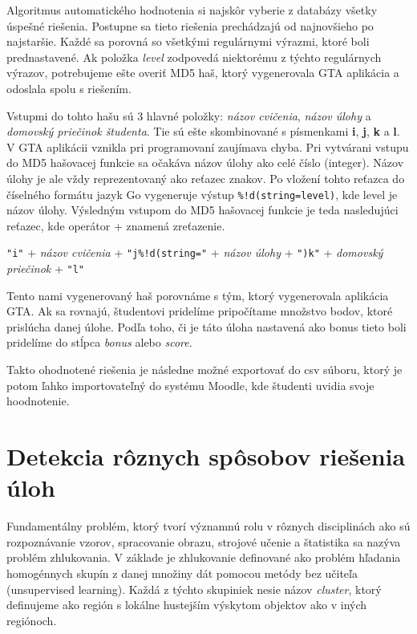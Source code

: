 Algoritmus automatického hodnotenia si najskôr vyberie z databázy všetky úspešné
riešenia. Postupne sa tieto riešenia prechádzajú od najnovšieho po najstaršie.
Každé sa porovná so všetkými regulárnymi výrazmi, ktoré boli prednastavené.
Ak položka \textit{level} zodpovedá niektorému z týchto regulárnych výrazov,
potrebujeme ešte overiť MD5 haš, ktorý vygenerovala GTA aplikácia a odoslala spolu
s riešením.

Vstupmi do tohto hašu sú 3 hlavné položky: \textit{názov cvičenia},
\textit{názov úlohy} a \textit{domovský priečinok študenta}. Tie sú ešte skombinované
s písmenkami \textbf{i}, \textbf{j}, \textbf{k} a \textbf{l}. V GTA aplikácii vznikla
pri programovaní zaujímava chyba. Pri vytvárani vstupu do MD5 hašovacej funkcie
sa očakáva názov úlohy ako celé číslo (integer). Názov úlohy je ale vždy reprezentovaný
ako reťazec znakov. Po vložení tohto reťazca do číselného formátu jazyk Go vygeneruje
výstup \verb'%!d(string=level)',
kde level je názov úlohy.
Výsledným vstupom do MD5 hašovacej funkcie je teda nasledujúci reťazec, kde operátor
+ znamená zreťazenie.

\begin{center}
	\verb'"i"' + \textit{názov cvičenia} + \verb'"j%!d(string="' +
	\textit{názov úlohy} + \verb'")k"' + \textit{domovský priečinok} + \verb'"l"'
\end{center}

Tento nami vygenerovaný haš porovnáme s tým, ktorý vygenerovala aplikácia GTA.
Ak sa rovnajú, študentovi pridelíme pripočítame množstvo bodov, ktoré prislúcha
danej úlohe. Podľa toho, či je táto úloha nastavená ako bonus tieto boli pridelíme
do stĺpca \textit{bonus} alebo \textit{score}.

Takto ohodnotené riešenia je následne možné exportovať do csv súboru, ktorý je
potom ľahko importovateľný do systému Moodle, kde študenti uvidia svoje hoodnotenie.

\section{Detekcia rôznych spôsobov riešenia úloh}
\label{sec:solutionclusterizing}

Fundamentálny problém, ktorý tvorí významnú rolu v rôznych disciplinách ako sú rozpoznávanie vzorov, spracovanie obrazu, strojové učenie a štatistika sa nazýva problém
zhlukovania. V základe je zhlukovanie definované ako problém hľadania
homogénnych skupín z danej množiny dát pomocou metódy bez učiteľa (unsupervised
learning). Každá z týchto skupiniek nesie názov
\textit{cluster}, ktorý definujeme ako región s lokálne hustejším výskytom objektov ako
v iných regiónoch.


